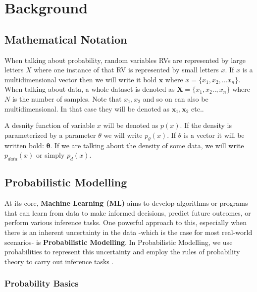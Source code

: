 \usetikzlibrary{calc}

\renewcommand{\vec}[1]{\textbf{#1}}
\newcommand{\norm}[1]{\left\lVert#1\right\rVert}


\chapter{Background}
\label{cha:background}

\section{Mathematical Notation}

When talking about probability, random variables RVs are represented by large letters $X$ where one instance of that RV is represented 
by small letters $x$. If $x$ is a multidimensional vector then we will write it bold $\vec x$ where $x = \{x_1, x_2, ... x_n\}$. 
When talking about data, a whole dataset is denoted as $\vec X = \{x_1, x_2 .. , x_n\}$ where $N$ is the number of samples. 
Note that $x_1, x_2$ and so on can also be multidimensional. In that case they will be denoted as $\vec x_1, \vec x_2$ etc..

A desnity function of variable $x$ will be denoted as $p(x)$. If the density is parameterized by a parameter $\theta$ we will write 
$p_\theta(x)$. If $\theta$ is a vector it will be written bold: $\boldsymbol{\theta}$.
If we are talking about the density of some data, we will write $p_{data}(x)$ or simply $p_d(x)$.

\section{Probabilistic Modelling}
\label{sec:pm}

At its core, \textbf{Machine Learning (ML)} aims to develop algorithms or programs that can learn from data to make informed decisions, predict future outcomes, or perform various inference tasks. 
One powerful approach to this, especially when there is an inherent 
uncertainty in the data -which is the case for most real-world scenarios- is \textbf{Probabilistic Modelling}.
In Probabilistic Modelling, we use probabilities to represent this uncertainty and employ the rules of probability theory to carry out inference tasks \cite{pc_intro}.

\subsection{Probability Basics}
\label{sec:prob_basics}

